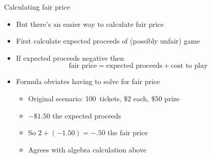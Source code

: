 \documentclass[handout]{beamer}
\theoremstyle{definition}
\begin{document}
\begin{frame}{Calculating fair price}
\begin{itemize}
\item But there's an easier way to calculate fair price
\item First calculate expected proceeds of (possibly unfair) game
\item If expected proceeds \alert{negative} then
\[\text{fair price}=\text{expected proceeds}+\text{cost to play}\]
\item Formula obviates having to solve for fair price
\begin{example}
\begin{itemize}
\item Original scenario: 100~tickets, $\$2$ each, $\$50$ prize
\item $-\$1.50$ the expected proceeds
\item So $2+\left(-1.50\right)=-.50$ the fair price
\item Agrees with algebra calculation above
\end{itemize}
\end{example}
\end{itemize}
\end{frame}
\end{document}
